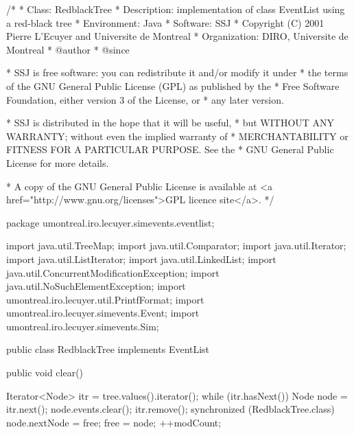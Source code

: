 \begin{code}
\begin{hide}
/*
 * Class:        RedblackTree
 * Description:  implementation of class EventList using a red-black tree
 * Environment:  Java
 * Software:     SSJ 
 * Copyright (C) 2001  Pierre L'Ecuyer and Universite de Montreal
 * Organization: DIRO, Universite de Montreal
 * @author       
 * @since

 * SSJ is free software: you can redistribute it and/or modify it under
 * the terms of the GNU General Public License (GPL) as published by the
 * Free Software Foundation, either version 3 of the License, or
 * any later version.

 * SSJ is distributed in the hope that it will be useful,
 * but WITHOUT ANY WARRANTY; without even the implied warranty of
 * MERCHANTABILITY or FITNESS FOR A PARTICULAR PURPOSE.  See the
 * GNU General Public License for more details.

 * A copy of the GNU General Public License is available at
   <a href="http://www.gnu.org/licenses">GPL licence site</a>.
 */
\end{hide}
package umontreal.iro.lecuyer.simevents.eventlist;\begin{hide}

import java.util.TreeMap;
import java.util.Comparator;
import java.util.Iterator;
import java.util.ListIterator;
import java.util.LinkedList;
import java.util.ConcurrentModificationException;
import java.util.NoSuchElementException;
import umontreal.iro.lecuyer.util.PrintfFormat;
import umontreal.iro.lecuyer.simevents.Event;
import umontreal.iro.lecuyer.simevents.Sim;
\end{hide}

public class RedblackTree implements EventList\begin{hide} {
   private TreeMap<Event, Node> tree = new TreeMap<Event, Node>(new EventComparator());
   private static Node free = null;
   private int modCount = 0;\end{hide}
\end{code}\begin{hide}\begin{code}

   public void clear()\begin{hide} {
      Iterator<Node> itr = tree.values().iterator();
      while (itr.hasNext()) {
         Node node = itr.next();
         node.events.clear();
         itr.remove();
         synchronized (RedblackTree.class) {
            node.nextNode = free;
            free = node;
         }
      }
      ++modCount;
   }\end{hide}


\end{code}
\end{hide}
